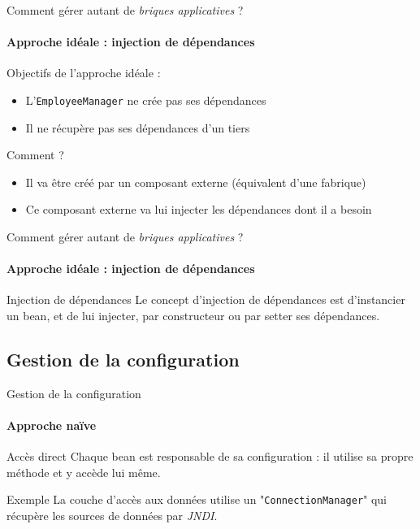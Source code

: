 \documentclass[compress]{beamer}%
\begin{document}
\begin{frame}{Comment gérer autant de \emph{briques applicatives} ?}
	\framesubtitle{Approche idéale : injection de dépendances}

	Objectifs de l'approche idéale :
	\begin{itemize}
	\item L'\texttt{EmployeeManager} ne crée pas ses dépendances
	\item Il ne récupère pas ses dépendances d'un tiers
	\end{itemize}
	
	\pause
	Comment ?
	\begin{itemize}
	\item Il va être créé par un composant externe (équivalent d'une fabrique)
	\item Ce composant externe va lui injecter les dépendances dont il a besoin
	\end{itemize}
	
\end{frame}


\begin{frame}{Comment gérer autant de \emph{briques applicatives} ?}
	\framesubtitle{Approche idéale : injection de dépendances}
	
	\begin{block}{Injection de dépendances}
	Le concept d'injection de dépendances est d'instancier un bean, et de lui injecter, par constructeur ou par setter ses dépendances.
	\end{block}	
\end{frame}


\subsection{Gestion de la configuration}

\begin{frame}{Gestion de la configuration}
	\framesubtitle{Approche naïve}
	
	\begin{block}{Accès direct}
	Chaque bean est responsable de sa configuration : il utilise sa propre méthode et y accède lui même.
	\end{block}
	
	\pause	
	\begin{exampleblock}{Exemple}
	La couche d'accès aux données utilise un "\texttt{ConnectionManager}" qui récupère les sources de données par \emph{JNDI}.
	\end{exampleblock}
	
\end{frame}
\end{document}
